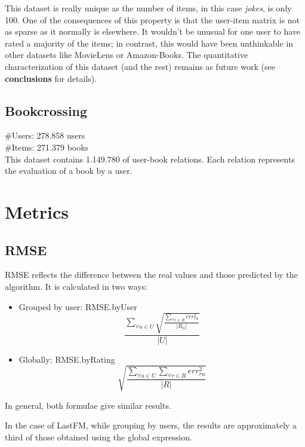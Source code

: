 \documentclass[a4paper]{article}
\begin{document}
This dataset is really unique as the number of items, in this case \textit{jokes}, is only 100. One of the consequences of this property is that the user-item matrix is not as sparse as it normally is elsewhere. It wouldn't be unusual for one user to have rated a majority of the items; in contrast, this would have been unthinkable in other datasets like MovieLens or Amazon-Books. The quantitative characterization of this dataset (and the rest) remains as future work (see \textbf{conclusions} for details).

\subsection{Bookcrossing}
\#Users: 278.858 users \\
\#Items: 271.379 books \\
This dataset contains 1.149.780 of user-book relations. Each relation represents the evaluation of a book by a user. 

\section{Metrics}
\subsection{RMSE}
RMSE reflects the difference between the real values and those predicted by the algorithm.
It is calculated in two ways:
\begin{itemize}
	\item Grouped by user: RMSE.byUser
	\begin{equation}
		\frac{\displaystyle\sum_{\forall u\in U}\sqrt{\frac{\displaystyle\sum_{\forall r \in R} err_{ru}^2}{|R_u|}}}{|U|}
    \end{equation}
    \item Globally: RMSE.byRating 
	\begin{equation}
		\sqrt{\frac{\displaystyle\sum_{\forall u \in U}\displaystyle\sum_{\forall r \in R} err_{ru}^2}{|R|}}
    \end{equation}
\end {itemize}

In general, both formulae give similar results.

In the case of LastFM, while grouping by users, the results are approximately a third of those obtained using the global expression.

\end{document}
